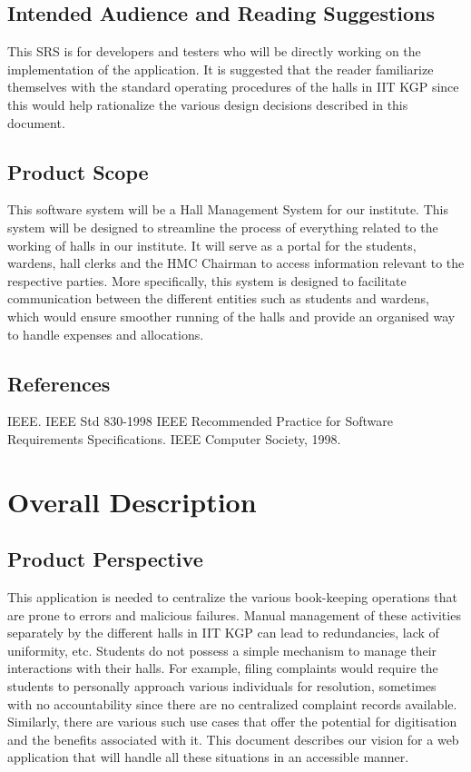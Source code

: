 \documentclass{scrreprt}
\begin{document}
\section{Intended Audience and Reading Suggestions}
This SRS is for developers and testers who will be directly working on the implementation of the application. It is suggested that the reader familiarize themselves with the standard operating procedures of the halls in IIT KGP since this would help rationalize the various design decisions described in this document.

\section{Product Scope}
This software system will be a Hall Management System for our institute. This system will be
designed to streamline the process of everything related to the working of halls in our institute.
It will serve as a portal for the students, wardens, hall clerks and the HMC Chairman to access
information relevant to the respective parties.
More specifically, this system is designed to facilitate communication between the different
entities such as students and wardens, which would ensure smoother running of the halls and
provide an organised way to handle expenses and allocations.


\section{References}
IEEE. IEEE Std 830-1998 IEEE Recommended Practice for Software Requirements Specifications. IEEE
Computer Society, 1998.

\chapter{Overall Description}

\section{Product Perspective}
This application is needed to centralize the various book-keeping operations that are prone to errors and malicious failures. Manual management of these activities separately by the different halls in IIT KGP can lead to redundancies, lack of uniformity, etc. Students do not possess a simple mechanism to manage their interactions with their halls. For example, filing complaints would require the students to personally approach various individuals for resolution, sometimes with no accountability since there are no centralized complaint records available. Similarly, there are various such use cases that offer the potential for digitisation and the benefits associated with it. This document describes our vision for a web application that will handle all these situations in an accessible manner.
\end{document}
